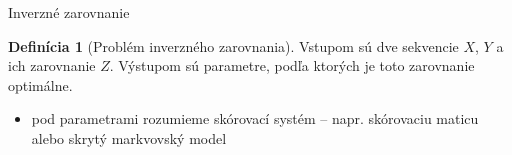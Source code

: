 \documentclass[xcolor=dvipsnames, compress, 12pt]{beamer}
\theoremstyle{definition}
\newtheorem{df}[vt]{Definícia}
\begin{document}
\begin{frame}{Inverzné zarovnanie}
  \begin{df}[Problém inverzného zarovnania]
  Vstupom sú dve sekvencie $X$, $Y$ a ich zarovnanie $Z$.
  Výstupom sú parametre, podľa ktorých je toto zarovnanie optimálne.
  \end{df}

  \begin{itemize}
    \item pod parametrami rozumieme skórovací systém -- napr. skórovaciu maticu alebo skrytý markvovský model
  \end{itemize}
\end{frame}



\end{document}
